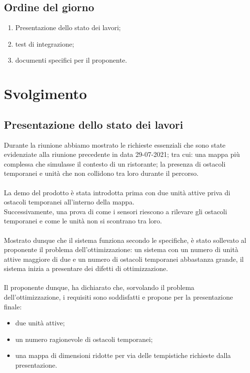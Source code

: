 \documentclass[]{article}
\begin{document}
	\subsection{Ordine del giorno}
	\begin{enumerate}
		\item Presentazione dello stato dei lavori;
		\item test di integrazione;
		\item documenti specifici per il proponente.
	\end{enumerate}
	\newpage
	\section{Svolgimento}


	\subsection{Presentazione dello stato dei lavori}
	Durante la riunione abbiamo mostrato le richieste essenziali che sono state evidenziate alla riunione precedente in data 29-07-2021; tra cui: una mappa più complessa che simulasse il contesto di un ristorante; la presenza di ostacoli temporanei e unità che non collidono tra loro durante il percorso. \\\\
	La demo del prodotto è stata introdotta prima con due unità attive priva di ostacoli temporanei all'interno della mappa.\\
	Successivamente, una prova di come i sensori riescono a rilevare gli ostacoli temporanei e come le unità non si scontrano tra loro.\\\\
	Mostrato dunque che il sistema funziona secondo le specifiche, è stato sollevato al proponente il problema dell'ottimizzazione: un sistema con un numero di unità attive maggiore di due e un numero di ostacoli temporanei abbastanza grande, il sistema inizia a presentare dei difetti di ottimizzazione. \\\\
	Il proponente dunque, ha dichiarato che, sorvolando il problema dell'ottimizzazione, i requisiti sono soddisfatti e propone per la presentazione finale:
	\begin{itemize}
		\item due unità attive;
		\item un numero ragionevole di ostacoli temporanei;
		\item una mappa di dimensioni ridotte per via delle tempistiche richieste dalla presentazione.
	\end{itemize}
\end{document}
